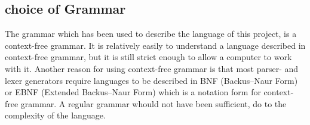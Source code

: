 \subsection{choice of Grammar}
The grammar which has been used to describe the language of this project, is a context-free grammar. It is relatively easily to understand a language described in context-free grammar, but it is still strict enough to allow a computer to work with it. Another reason for using context-free grammar is that most parser- and lexer generators require languages to be described in BNF (Backus–Naur Form) or EBNF (Extended Backus–Naur Form) which is a notation form for context-free grammar. A regular grammar whould not have been sufficient, do to the complexity of the language.